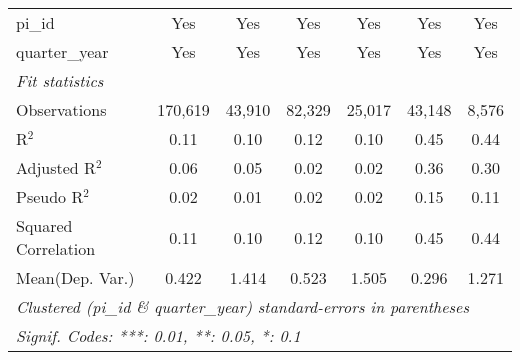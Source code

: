 \begin{tabular}{lcccccc}
   pi\_id                                                     & Yes          & Yes           & Yes           & Yes           & Yes           & Yes\\  
   quarter\_year                                              & Yes          & Yes           & Yes           & Yes           & Yes           & Yes\\  
   \midrule
   \emph{Fit statistics}\\
   Observations                                               & 170,619      & 43,910        & 82,329        & 25,017        & 43,148        & 8,576\\  
   R$^2$                                                      & 0.11         & 0.10          & 0.12          & 0.10          & 0.45          & 0.44\\  
   Adjusted R$^2$                                             & 0.06         & 0.05          & 0.02          & 0.02          & 0.36          & 0.30\\  
   Pseudo R$^2$                                               & 0.02         & 0.01          & 0.02          & 0.02          & 0.15          & 0.11\\  
   Squared Correlation                                        & 0.11         & 0.10          & 0.12          & 0.10          & 0.45          & 0.44\\  
Mean(Dep. Var.) & 0.422 & 1.414 & 0.523 & 1.505 & 0.296 & 1.271 \\
   \midrule \midrule
   \multicolumn{7}{l}{\emph{Clustered (pi\_id \& quarter\_year) standard-errors in parentheses}}\\
   \multicolumn{7}{l}{\emph{Signif. Codes: ***: 0.01, **: 0.05, *: 0.1}}\\
\end{tabular}
\par\endgroup
